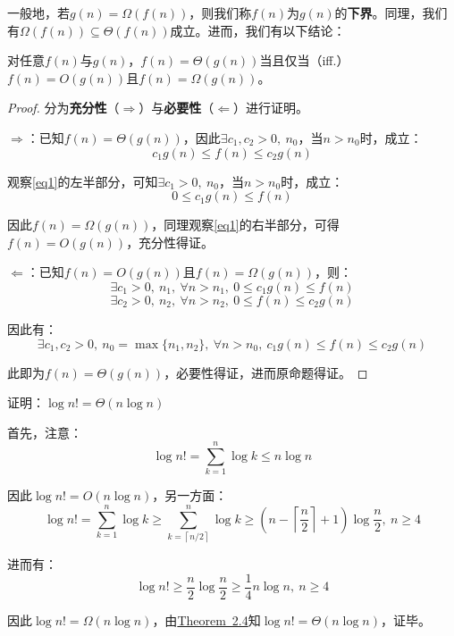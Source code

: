 \documentclass[12pt,a4paper,violet]{bbe}
\begin{document}
一般地，若$g(n)=\Omega(f(n))$，则我们称$f(n)$为$g(n)$的\textbf{下界}。同理，我们有$\Omega(f(n))\subseteq\Theta(f(n))$成立。进而，我们有以下结论：
\begin{theorem}\label{the2.4}
	对任意$f(n)$与$g(n)$，$f(n)=\Theta(g(n))$当且仅当（iff.）$f(n)=O(g(n))$且$f(n)=\Omega(g(n))$。
\end{theorem}
\begin{proof}
分为\textbf{充分性}（$\Rightarrow$）与\textbf{必要性}（$\Leftarrow$）进行证明。

$\Rightarrow$：已知$f(n)=\Theta(g(n))$，因此$\exists c_1,c_2>0,~n_0$，当$n>n_0$时，成立：
\begin{equation}
	c_1g(n)\leqslant f(n)\leqslant c_2g(n)
	\label{eq1}
\end{equation}



观察\cref{eq1}的左半部分，可知$\exists c_1>0,~n_0$，当$n>n_0$时，成立：
$$
0\leqslant c_1g(n)\leqslant f(n)
$$

因此$f(n)=\Omega(g(n))$，同理观察\cref{eq1}的右半部分，可得$f(n)=O(g(n))$，充分性得证。

$\Leftarrow$：已知$f(n)=O(g(n))$且$f(n)=\Omega(g(n))$，则：
$$
\exists c_1>0,~n_1,~\forall n>n_1,~0\leqslant c_1g(n)\leqslant f(n)
$$
$$
\exists c_2>0,~n_2,~\forall n>n_2,~0\leqslant f(n)\leqslant c_2g(n)
$$

因此有：
$$
\exists c_1,c_2>0,~n_0=\max\{n_1,n_2\},~\forall n>n_0,~c_1g(n)\leqslant f(n)\leqslant c_2g(n)
$$

此即为$f(n)=\Theta(g(n))$，必要性得证，进而原命题得证。
\end{proof}
\begin{example}
	证明：$\log n!=\Theta(n\log n)$

\end{example}
\begin{solution}
首先，注意：
$$
\log n!=\sum\limits_{k=1}^n\log k\leqslant n\log n
$$

因此$\log n!=O(n\log n)$，另一方面：
$$
\log n!=\sum\limits_{k=1}^n\log k\geqslant\sum\limits_{k=\left\lceil n/2\right\rceil}^n\log k\geqslant (n-\left\lceil\frac{n}{2}\right\rceil+1)\log\frac{n}{2},~n\geqslant 4
$$

进而有：
$$
\log n!\geqslant\frac{n}{2}\log\frac{n}{2}\geqslant\frac{1}{4}n\log n,~n\geqslant4
$$

因此$\log n!=\Omega(n\log n)$，由\hyperref[the2.4]{Theorem~2.4}知$\log n!=\Theta(n\log n)$，证毕。
\end{solution}
\end{document}
